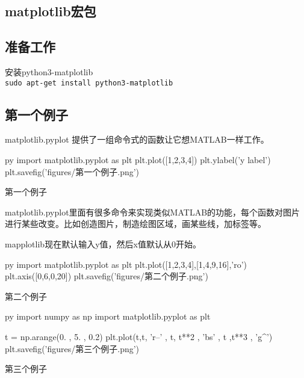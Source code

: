 \documentclass[11pt,oneside]{book}
\begin{document}
\begin{common-format}
\mainmatter


\chapter{matplotlib宏包}
\section{准备工作}
安装python3-matplotlib\\
\verb+sudo apt-get install python3-matplotlib+

\section{第一个例子}
matplotlib.pyplot 提供了一组命令式的函数让它想MATLAB一样工作。
\begin{xverbatim}[0]{py}
import matplotlib.pyplot as plt
plt.plot([1,2,3,4])
plt.ylabel('y label')
plt.savefig('figures/第一个例子.png')
\end{xverbatim}

\begin{fig}{第一个例子}
\end{fig}

matplotlib.pyplot里面有很多命令来实现类似MATLAB的功能，每个函数对图片进行某些改变。比如创造图片，制造绘图区域，画某些线，加标签等。

mapplotlib现在默认输入y值，然后x值默认从0开始。

\begin{xverbatim}[0]{py}
import matplotlib.pyplot as plt
plt.plot([1,2,3,4],[1,4,9,16],'ro')
plt.axis([0,6,0,20])
plt.savefig('figures/第二个例子.png')
\end{xverbatim}

\begin{fig}{第二个例子}
\end{fig}

\begin{xverbatim}[0]{py}
import numpy as np
import matplotlib.pyplot as plt

t = np.arange(0. , 5. , 0.2)
plt.plot(t,t, 'r--' , t, t**2 , 'bs' , t ,t**3 , 'g^')
plt.savefig('figures/第三个例子.png')
\end{xverbatim}

\begin{linefig}{第三个例子}
\end{linefig}



\end{common-format}
\end{document}
